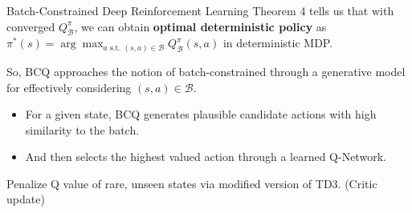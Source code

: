 \documentclass[11pt]{beamer}
\newcommand{\mc}[1]{\mathcal{#1}}
\newcommand{\tb}[1]{\textbf{#1}}
\begin{document}
\begin{frame}{Batch-Constrained Deep Reinforcement Learning}
    Theorem 4 tells us that with converged $Q^\pi_{\mc{B}}$, we can obtain \tb{optimal deterministic policy} as $\pi^\ast(s) = \arg \max_{a \text{ s.t. } (s,a) \in \mc{B}}Q^\pi_{\mc{B}}(s,a)$ in deterministic MDP.

    \vspace{1cm}
    So, BCQ approaches the notion of batch-constrained through a generative model for effectively considering $(s,a) \in \mc{B}$.
    \begin{itemize}
        \item For a given state, BCQ generates plausible candidate actions with high similarity to the batch.
        \item And then selects the highest valued action through a learned Q-Network.
    \end{itemize}

    Penalize Q value of rare, unseen states via modified version of TD3. (Critic update)
\end{frame}
\end{document}

